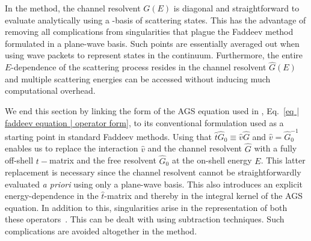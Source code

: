 \documentclass[aps,prc,showpacs,twocolumn,floatfix,nobibnotes,nofootinbib,amsmath,amssymb,longbibliography]{revtex4-2}
\begin{document}
In the \wpcd{} method, the channel resolvent $G(E)$ is diagonal and
straightforward to evaluate analytically using a \wpcd-basis of
scattering states. This has the advantage of removing all
complications from singularities that plague the Faddeev method
formulated in a plane-wave basis. Such points are essentially averaged
out when using wave packets to represent states in the
continuum. Furthermore, the entire $E$-dependence of the scattering
process resides in the channel resolvent $\hat{G}(E)$ and multiple
scattering energies can be accessed without inducing much
computational overhead.

We end this section by linking the form of the AGS equation used in
\wpcd{}, Eq.~\eqref{eq | faddeev equation | operator form}, to its
conventional formulation used as a starting point in standard Faddeev
methods. Using that $\hat{t}\hat{G}_0 \equiv \hat{v}\hat{G}$ and
$\hat{v}=\hat{G}_0^{-1}$ enables us to replace the interaction
$\hat{v}$ and the channel resolvent $\hat{G}$ with a fully off-shell
\NN{} $t-$matrix and the free resolvent $\hat{G}_0$ at the on-shell
energy $E$. This latter replacement is necessary since the channel
resolvent cannot be straightforwardly evaluated \textit{a priori}
using only a plane-wave basis. This also introduces an explicit
energy-dependence in the \NN{} $\hat{t}$-matrix and thereby in the
integral kernel of the AGS equation. In addition to this,
singularities arise in the representation of both these
operators~\cite{Gloeckle:1995jg}. This can be dealt with using
subtraction techniques. Such complications are avoided altogether in
the \wpcd{} method.
\end{document}
